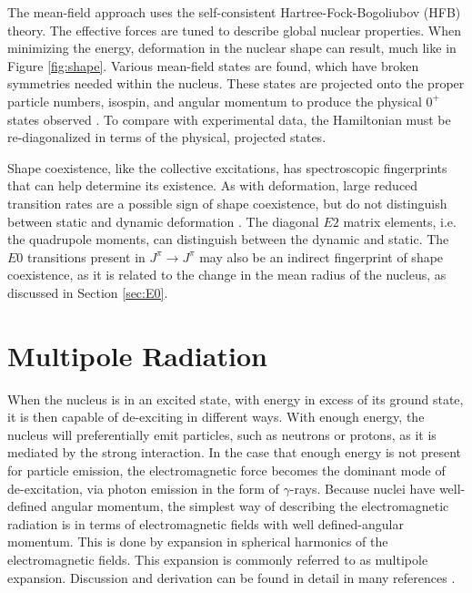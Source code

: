The mean-field approach uses the self-consistent Hartree-Fock-Bogoliubov (HFB) theory. The effective forces are tuned to describe global nuclear properties. When minimizing the energy, deformation in the nuclear shape can result, much like in Figure \ref{fig:shape}. Various mean-field states are found, which have broken symmetries needed within the nucleus. These states are projected onto the proper particle numbers, isospin, and angular momentum to produce the physical $0^+$ states observed \citep{heyde11:_shape_coexist}. To compare with experimental data, the Hamiltonian must be re-diagonalized in terms of the physical, projected states.

Shape coexistence, like the collective excitations, has spectroscopic fingerprints that can help determine its existence. As with deformation, large reduced transition rates are a possible sign of shape coexistence, but do not distinguish between static and dynamic deformation \citep{heyde11:_shape_coexist}. The diagonal $E2$ matrix elements, i.e. the quadrupole moments, can distinguish between the dynamic and static. The $E0$ transitions present in $J^{\pi}\rightarrow J^{\pi}$ may also be an indirect fingerprint of shape coexistence, as it is related to the change in the mean radius of the nucleus, as discussed in Section \ref{sec:E0}\citep{wood99:_e0}.

\section{Multipole Radiation}
\label{sec:multipole}
When the nucleus is in an excited state, with energy in excess of its ground state, it is then capable of de-exciting in different ways. With enough energy, the nucleus will preferentially emit particles, such as neutrons or protons, as it is mediated by the strong interaction. In the case that enough energy is not present for particle emission, the electromagnetic force becomes the dominant mode of de-excitation, via photon emission in the form of $\gamma$-rays. Because nuclei have well-defined angular momentum, the simplest way of describing the electromagnetic radiation is in terms of electromagnetic fields with well defined-angular momentum. This is done by expansion in spherical harmonics of the electromagnetic fields. This expansion is commonly referred to as multipole expansion. Discussion and derivation can be found in detail in many references \citep{blatt79:_emradiation, jackson99:_emradiation, zangwill13:_emradiation, brink93:_emradiation}.

